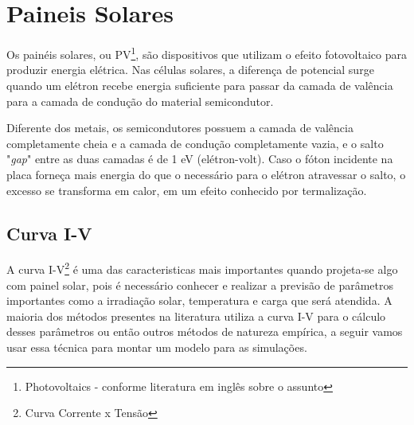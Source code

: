 
\section{Paineis Solares}
Os painéis solares, ou PV\footnote{Photovoltaics - conforme literatura em inglês sobre o assunto}, são dispositivos que utilizam o efeito fotovoltaico para produzir energia elétrica. Nas células solares, a diferença de potencial surge quando um elétron recebe energia suficiente para passar da camada de valência para a camada de condução do material semicondutor.

Diferente dos metais, os semicondutores possuem a camada de valência completamente cheia e a camada de condução completamente vazia, e o salto "\textit{gap}" entre as duas camadas é de 1 eV (elétron-volt). Caso o fóton incidente na placa forneça mais energia do que o necessário para o elétron atravessar o salto, o excesso se transforma em calor, em um efeito conhecido por termalização.

\subsection*{Curva I-V}
A curva I-V\footnote{Curva Corrente x Tensão} é uma das caracteristicas mais importantes quando projeta-se algo com painel solar, pois é necessário conhecer e realizar a previsão de parâmetros importantes como a irradiação solar, temperatura e carga que será atendida. A maioria dos métodos presentes na literatura utiliza a curva I-V para o cálculo desses parâmetros ou então outros métodos de natureza empírica, a seguir vamos usar essa técnica\cite{pv_datasheet} para montar um modelo para as simulações.

